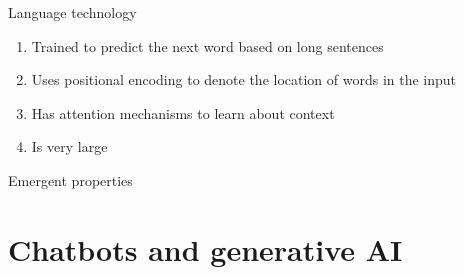 \documentclass[8pt]{beamer}
\begin{document}
	\begin{frame}{Language technology}
		\begin{enumerate}
			\item Trained to predict the next word based on long sentences
			\item Uses positional encoding to denote the location of words in the input
			\item Has attention mechanisms to learn about context
			\item Is very large
		\end{enumerate}
	\end{frame}

	\begin{frame}{Emergent properties} %
		\centering
	\end{frame}

	\section{Chatbots and generative AI}
\end{document}
